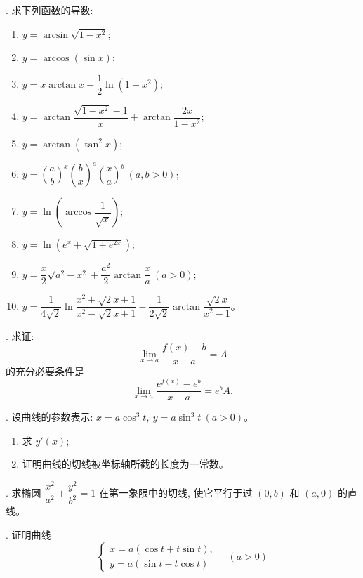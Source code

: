 \documentclass[UTF8, 12pt, fontset=fandol, oneside]{ctexart}
\begin{document}
. 求下列函数的导数:
\begin{enumerate}
  \item $y=\arcsin\sqrt{1-x^2}$;
  \item $y=\arccos(\sin x)$;
  \item $y=x\arctan x-\dfrac12\ln(1+x^2)$;
  \item $y=\arctan\dfrac{\sqrt{1-x^2}-1}{x}+\arctan\dfrac{2x}{1-x^2}$;
  \item $y=\arctan(\tan^2x)$;
  \item $y=\left(\dfrac ab\right)^x\left(\dfrac bx\right)^a\left(\dfrac xa\right)^b\ (a,b>0)$;
  \item $y=\ln\left(\arccos\dfrac1{\sqrt{x}}\right)$;
  \item $y=\ln(e^x+\sqrt{1+e^{2x}})$;
  \item $y=\dfrac x2\sqrt{a^2-x^2}+\dfrac{a^2}{2}\arctan\dfrac xa\ (a>0)$;
  \item $y=\dfrac1{4\sqrt2}\ln\dfrac{x^2+\sqrt2x+1}{x^2-\sqrt2x+1}-\dfrac1{2\sqrt2}\arctan\dfrac{\sqrt2x}{x^2-1}$。
\end{enumerate}

. 求证:
\[
  \lim_{x\to a}\frac{f(x)-b}{x-a}=A
\]
的充分必要条件是
\[
  \lim_{x\to a}\frac{e^{f(x)}-e^b}{x-a}=e^bA.
\]

. 设曲线的参数表示: $x=a\cos^3t,\ y=a\sin^3t\ (a>0)$。
\begin{enumerate}
  \item 求 $y'(x)$;
  \item 证明曲线的切线被坐标轴所截的长度为一常数。
\end{enumerate}

. 求椭圆 $\dfrac{x^2}{a^2}+\dfrac{y^2}{b^2}=1$ 在第一象限中的切线, 使它平行于过 $(0,b)$ 和 $(a,0)$ 的直线。

. 证明曲线
\[
  \begin{cases}
    x=a(\cos t+t\sin t),\\
    y=a(\sin t-t\cos t)
  \end{cases}
  \quad(a>0)
\]
\end{document}
